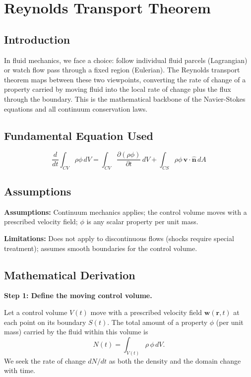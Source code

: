 \chapter{Reynolds Transport Theorem}

\section*{Introduction}

In fluid mechanics, we face a choice: follow individual fluid parcels (Lagrangian) or watch flow pass through a fixed region (Eulerian). The Reynolds transport theorem maps between these two viewpoints, converting the rate of change of a property carried by moving fluid into the local rate of change plus the flux through the boundary. This is the mathematical backbone of the Navier-Stokes equations and all continuum conservation laws.
\section*{Fundamental Equation Used}

\begin{equation}
\frac{d}{dt}\int_{CV} \rho\phi\, dV = \int_{CV} \frac{\partial(\rho\phi)}{\partial t}\, dV + \int_{CS} \rho\phi\,\mathbf{v}\cdot\hat{\mathbf{n}}\, dA
\end{equation}
\section*{Assumptions}

\textbf{Assumptions:} Continuum mechanics applies; the control volume moves with a prescribed velocity field; $\phi$ is any scalar property per unit mass.


\textbf{Limitations:} Does not apply to discontinuous flows (shocks require special treatment); assumes smooth boundaries for the control volume.


\section*{Mathematical Derivation}

\textbf{Step 1: Define the moving control volume.}

Let a control volume $V(t)$ move with a prescribed velocity field $\mathbf{w}(\mathbf{r},t)$ at each point on its boundary $S(t)$. The total amount of a property $\phi$ (per unit mass) carried by the fluid within this volume is
\begin{equation}
N(t) = \int_{V(t)} \rho\,\phi\,dV.
\end{equation}
We seek the rate of change $dN/dt$ as both the density and the domain change with time.


